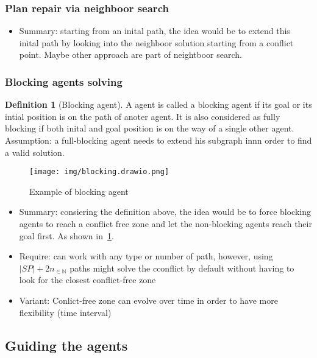 \documentclass{article}
\theoremstyle{definition}
\newtheorem{definition}{Definition}[section]
\newcommand\widthimg{11cm}
\begin{document}
\subsubsection{Plan repair\cite{konopenikobr13a} via neighboor search}
\begin{itemize}
  \item Summary: starting from an inital path, the idea would be to extend this inital path by looking into the neighboor solution starting from a conflict point. Maybe other approach are part of neightboor search\cite{lichhadapeko22a}.
\end{itemize}

\subsubsection{Blocking agents solving}

\begin{definition}[Blocking agent]
  A agent is called a blocking agent if its goal or its intial position is on the path of anoter agent. It is also considered as fully blocking if both inital and goal position is on the way of a single other agent. Assumption: a full-blocking agent needs to extend his subgraph innn order to find a valid solution.

\end{definition}
\begin{figure}[H]\label{img:blocking_agent}
  \centering
  \caption{Example of blocking agent}
  \texttt{[image: img/blocking.drawio.png]}
\end{figure}

\begin{itemize}
  \item Summary: consiering the definition above, the idea would be to force blocking agents to reach a conflict free zone and let the non-blocking agents reach their goal first. As shown in~\ref{img:blocking_agent}.
  \item Require: can work with any type or number of path, however, using $|SP|+2n_{\in \mathbb{N}}$ paths might solve the cconflict by default without having to look for the closest conflict-free zone
  \item Variant: Conlict-free zone can evolve over time in order to have more flexibility (time interval)
\end{itemize}



\subsection{Guiding the agents}
\end{document}
